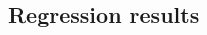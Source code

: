 \documentclass[letter,12pt]{article}
\begin{document}
\begin{multicols}{2}












\end{multicols}

\subsection{Regression results}
\end{document}

